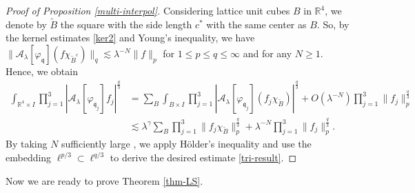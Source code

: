 \documentclass[10pt] %
{amsart}
\theoremstyle{plain}
\numberwithin{equation}{section}
\newcommand{\R}{\mathbb R}
\newcommand{\fq}{\mathfrak q}
\begin{document}
\begin{proof}[Proof of Proposition \ref{multi-interpol}]
  
Considering lattice unit cubes $B$ in $\R^4$, we denote by $\widetilde B$ the square with the side length $c^*$ with the same center as $B$. 
So, by the kernel estimates \eqref{ker2} and Young's inequality, we have $\|\mathcal A_\lambda [\varphi_{\fq}](f\chi_{ {\widetilde B}^{ c}}) \|_q \lesssim \lambda^{-N}\|f\|_p$ for $1\le p \le q \le \infty$ and for any $N\ge1$.
Hence, we obtain 
\begin{align*}
\int_{\R^4\times I}\prod_{j=1}^3 |\mathcal A_\lambda [\varphi_{\fq_j}] f_j|^{\frac q3}
& =\sum_B
\int_{B\times I}\prod_{j=1}^3 |\mathcal A_\lambda [\varphi_{\fq_j}] (f_j\chi_{\widetilde B})|^{\frac q3}
+O(\lambda^{-N})\prod_{j=1}^3\|f_j\|_p^{\frac q3} \\ 
& \lesssim \lambda^{\gamma}
\sum_B \prod_{j=1}^3 \|f_j \chi_{\widetilde B}\|_p^{\frac q3} +\lambda^{-N} \prod_{j=1}^3
\|f_j\|_p^{\frac q3}.
\end{align*}
By taking $N$ sufficiently large , we apply H\"older's inequality and use the embedding $\ell^{p/3} \subset \ell^{q/3}$ 
to derive the desired estimate \eqref{tri-result}.
\end{proof}





Now we are ready to prove Theorem \ref{thm-LS}.
\end{document}
